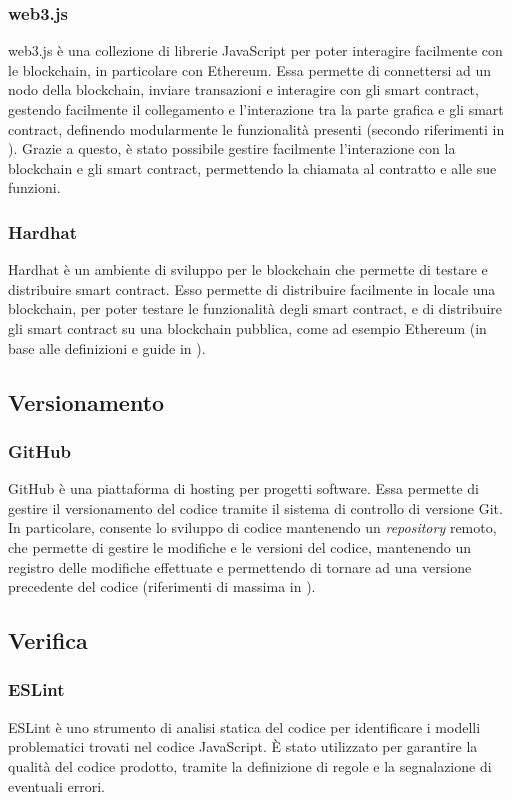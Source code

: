 \subsubsection{web3.js}
web3.js è una collezione di librerie JavaScript per poter interagire facilmente con le blockchain, in particolare con Ethereum.
Essa permette di connettersi ad un nodo della blockchain, inviare transazioni e interagire con gli smart contract, gestendo facilmente il collegamento
e l'interazione tra la parte grafica e gli smart contract, definendo modularmente le funzionalità presenti (secondo riferimenti in \cite{site:web3}).
Grazie a questo, è stato possibile gestire facilmente l'interazione con la blockchain e gli smart contract, permettendo la chiamata al contratto
e alle sue funzioni.

\subsubsection{Hardhat}
Hardhat è un ambiente di sviluppo per le blockchain che permette di testare e distribuire smart contract. Esso permette di distribuire facilmente
in locale una blockchain, per poter testare le funzionalità degli smart contract, e di distribuire gli smart contract su una blockchain pubblica, come ad esempio
Ethereum (in base alle definizioni e guide in \cite{site:hardhat}).

\subsection{Versionamento}

\subsubsection{GitHub}
GitHub è una piattaforma di hosting per progetti software. Essa permette di gestire il versionamento del codice tramite il sistema di controllo di versione Git.
In particolare, consente lo sviluppo di codice mantenendo un \textit{repository} remoto, che permette di gestire le modifiche e le versioni del codice, mantenendo un registro
delle modifiche effettuate e permettendo di tornare ad una versione precedente del codice (riferimenti di massima in \cite{site:github}). 

\subsection{Verifica}

\subsubsection{ESLint}
ESLint è uno strumento di analisi statica del codice per identificare i modelli problematici trovati nel codice JavaScript.
È stato utilizzato per garantire la qualità del codice prodotto, tramite la definizione di regole e la segnalazione di eventuali errori.

